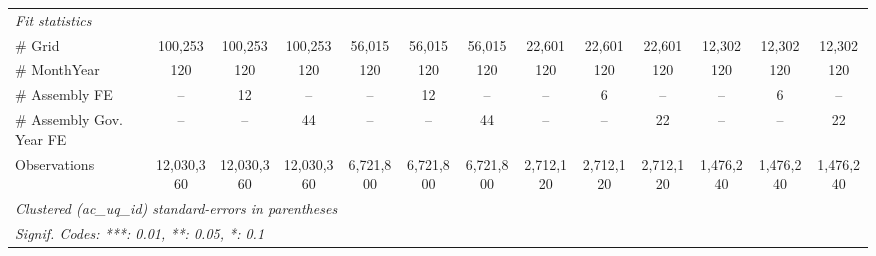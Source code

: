 \begin{table}[htbp]
\begin{tabular}{lcccccccccccc}
      \midrule
      \emph{Fit statistics}\\
      \# Grid                   & 100,253    & 100,253       & 100,253       & 56,015    & 56,015        & 56,015        & 22,601       & 22,601       & 22,601       & 12,302    & 12,302    & 12,302\\  
      \# MonthYear              & 120        & 120           & 120           & 120       & 120           & 120           & 120          & 120          & 120          & 120       & 120       & 120\\  
      \# Assembly FE            & --         & 12            & --            & --        & 12            & --            & --           & 6            & --           & --        & 6         & --\\  
      \# Assembly Gov. Year FE  & --         & --            & 44            & --        & --            & 44            & --           & --           & 22           & --        & --        & 22\\  
      Observations              & 12,030,360 & 12,030,360    & 12,030,360    & 6,721,800 & 6,721,800     & 6,721,800     & 2,712,120    & 2,712,120    & 2,712,120    & 1,476,240 & 1,476,240 & 1,476,240\\  
      \midrule \midrule
      \multicolumn{13}{l}{\emph{Clustered (ac\_uq\_id) standard-errors in parentheses}}\\
      \multicolumn{13}{l}{\emph{Signif. Codes: ***: 0.01, **: 0.05, *: 0.1}}\\
   \end{tabular}
\end{table}


